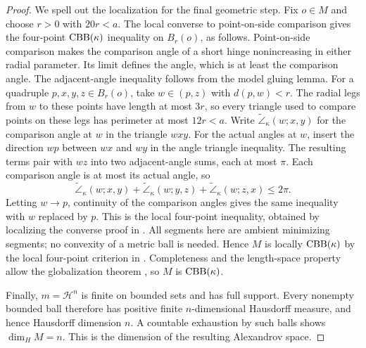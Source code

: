 \begin{proof}
We spell out the localization for the final geometric step.
Fix \(o\in M\) and choose \(r>0\) with \(20r<a\).
The local converse to point-on-side comparison gives the
four-point \(\mathrm{CBB}(\kappa)\) inequality on \(B_r(o)\),
as follows. Point-on-side
comparison makes the comparison angle of a short hinge
nonincreasing in either radial parameter. Its limit defines
the angle, which is at least the comparison angle. The
adjacent-angle inequality follows from the model gluing lemma.
For a quadruple \(p,x,y,z\in B_r(o)\), take
\(w\in(p,z)\) with \(d(p,w)<r\). The radial legs from \(w\)
to these points have length at most \(3r\), so every triangle
used to compare points on these legs has perimeter at most
\(12r<a\). Write \(\widetilde\angle_\kappa(w;x,y)\) for
the comparison angle at \(w\) in the triangle \(wxy\).
For the actual angles at \(w\), insert the direction \(wp\) between
\(wx\) and \(wy\) in the angle triangle inequality. The resulting
terms pair with \(wz\) into two adjacent-angle sums, each at most
\(\pi\). Each comparison angle is at most its actual angle, so
\[
\widetilde\angle_\kappa(w;x,y)
+\widetilde\angle_\kappa(w;y,z)
+\widetilde\angle_\kappa(w;z,x)\le2\pi.
\]
Letting \(w\to p\), continuity of the comparison angles gives
the same inequality with \(w\) replaced by \(p\).
This is the local four-point inequality, obtained by localizing
the converse proof in
\cite[Theorem~8.14]{AKP2024}. All segments here are ambient
minimizing segments; no convexity of a metric ball is needed.
Hence \(M\) is locally \(\mathrm{CBB}(\kappa)\) by the local four-point
criterion in \cite[Theorem~8.30, condition~(1)]{AKP2024}.
Completeness and the length-space property allow the globalization theorem
\cite[Theorem~8.31]{AKP2024}, so \(M\) is \(\mathrm{CBB}(\kappa)\).

Finally, \(m=\mathcal H^n\) is finite on bounded sets and has
full support. Every nonempty bounded ball therefore has
positive finite \(n\)-dimensional Hausdorff measure, and hence
Hausdorff dimension \(n\). A countable exhaustion by such
balls shows \(\dim_H M=n\). This is the dimension of the
resulting Alexandrov space.
\end{proof}
